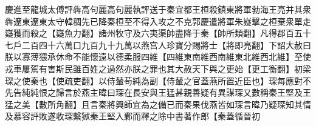 慶進至龍城太傅評犇高句麗高句麗執評送于秦宜都王桓殺鎮東將軍勃海王亮并其衆犇遼東遼東太守韓稠先已降秦桓至不得入攻之不克郭慶遣將軍朱嶷擊之桓棄衆單走嶷獲而殺之【嶷魚力翻】諸州牧守及六夷渠帥盡降于秦【帥所類翻】凡得郡百五十七戶二百四十六萬口九百九十九萬以燕宫人珍寶分賜將士【將即亮翻】下詔大赦曰朕以寡薄猥承休命不能懷遠以德柔服四維【四維東南維西南維東北維西北維】至使戎車屢駕有害斯民雖百姓之過然亦朕之罪也其大赦天下與之更始【更工衡翻】初梁琛之使秦也【使疏吏翻】以侍輦苟純為副【侍輦之官蓋燕所置近臣也】琛每應對不先告純純恨之歸言於燕主暐曰琛在長安與王猛甚親善疑有異謀琛又數稱秦王堅及王猛之美【數所角翻】且言秦將興師宜為之備已而秦果伐燕皆如琛言暐乃疑琛知其情及慕容評敗遂收琛繫獄秦王堅入鄴而釋之除中書著作郎【秦蓋循晉初